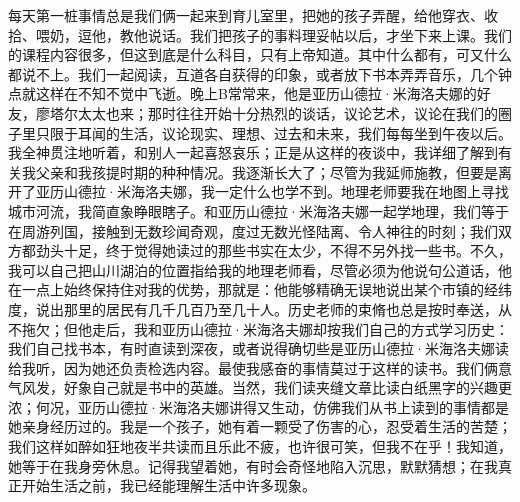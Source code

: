 \documentclass[12pt, UTF8]{ctexbook}
\begin{document}
\par 每天第一桩事情总是我们俩一起来到育儿室里，把她的孩子弄醒，给他穿衣、收拾、喂奶，逗他，教他说话。我们把孩子的事料理妥帖以后，才坐下来上课。我们的课程内容很多，但这到底是什么科目，只有上帝知道。其中什么都有，可又什么都说不上。我们一起阅读，互道各自获得的印象，或者放下书本弄弄音乐，几个钟点就这样在不知不觉中飞逝。晚上B常常来，他是亚历山德拉·米海洛夫娜的好友，廖塔尔太太也来；那时往往开始十分热烈的谈话，议论艺术，议论在我们的圈子里只限于耳闻的生活，议论现实、理想、过去和未来，我们每每坐到午夜以后。我全神贯注地听着，和别人一起喜怒哀乐；正是从这样的夜谈中，我详细了解到有关我父亲和我孩提时期的种种情况。我逐渐长大了；尽管为我延师施教，但要是离开了亚历山德拉·米海洛夫娜，我一定什么也学不到。地理老师要我在地图上寻找城市河流，我简直象睁眼瞎子。和亚历山德拉·米海洛夫娜一起学地理，我们等于在周游列国，接触到无数珍闻奇观，度过无数光怪陆离、令人神往的时刻；我们双方都劲头十足，终于觉得她读过的那些书实在太少，不得不另外找一些书。不久，我可以自己把山川湖泊的位置指给我的地理老师看，尽管必须为他说句公道话，他在一点上始终保持住对我的优势，那就是：他能够精确无误地说出某个市镇的经纬度，说出那里的居民有几千几百乃至几十人。历史老师的束脩也总是按时奉送，从不拖欠；但他走后，我和亚历山德拉·米海洛夫娜却按我们自己的方式学习历史：我们自己找书本，有时直读到深夜，或者说得确切些是亚历山德拉·米海洛夫娜读给我听，因为她还负责检选内容。最使我感奋的事情莫过于这样的读书。我们俩意气风发，好象自己就是书中的英雄。当然，我们读夹缝文章比读白纸黑字的兴趣更浓；何况，亚历山德拉·米海洛夫娜讲得又生动，仿佛我们从书上读到的事情都是她亲身经历过的。我是一个孩子，她有着一颗受了伤害的心，忍受着生活的苦楚；我们这样如醉如狂地夜半共读而且乐此不疲，也许很可笑，但我不在乎！我知道，她等于在我身旁休息。记得我望着她，有时会奇怪地陷入沉思，默默猜想；在我真正开始生活之前，我已经能理解生活中许多现象。
\end{document}
